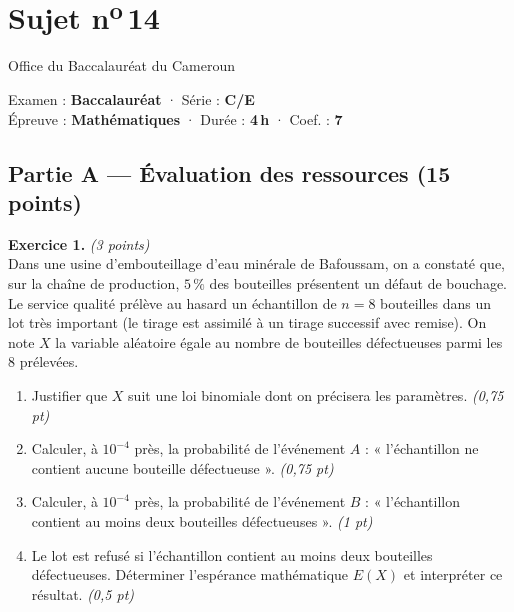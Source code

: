 \section{Sujet n\textsuperscript{o}\,14}
\noindent\begin{minipage}{0.5\linewidth}\footnotesize Office du Baccalauréat du Cameroun\end{minipage}%
\hfill\begin{minipage}{0.45\linewidth}\footnotesize\raggedleft Examen : \textbf{Baccalauréat} · Série : \textbf{C/E}\\
Épreuve : \textbf{Mathématiques} · Durée : \textbf{4\,h} · Coef. : \textbf{7}\end{minipage}
\par\smallskip{\color{onbo}\rule{\linewidth}{1pt}}

\subsection*{Partie A — Évaluation des ressources \hfill (15 points)}

\noindent\textbf{Exercice 1.} \hfill\textit{(3 points)}\\
Dans une usine d'embouteillage d'eau minérale de Bafoussam, on a constaté que, sur la
chaîne de production, $5\,\%$ des bouteilles présentent un défaut de bouchage. Le service
qualité prélève au hasard un échantillon de $n=8$ bouteilles dans un lot très important
(le tirage est assimilé à un tirage successif avec remise). On note $X$ la variable
aléatoire égale au nombre de bouteilles défectueuses parmi les $8$ prélevées.
\begin{enumerate}[label=\arabic*)]
\item Justifier que $X$ suit une loi binomiale dont on précisera les paramètres. \hfill\textit{(0,75 pt)}
\item Calculer, à $10^{-4}$ près, la probabilité de l'événement $A$ : « l'échantillon ne
contient aucune bouteille défectueuse ». \hfill\textit{(0,75 pt)}
\item Calculer, à $10^{-4}$ près, la probabilité de l'événement $B$ : « l'échantillon
contient au moins deux bouteilles défectueuses ». \hfill\textit{(1 pt)}
\item Le lot est refusé si l'échantillon contient au moins deux bouteilles défectueuses.
Déterminer l'espérance mathématique $E(X)$ et interpréter ce résultat. \hfill\textit{(0,5 pt)}
\end{enumerate}

